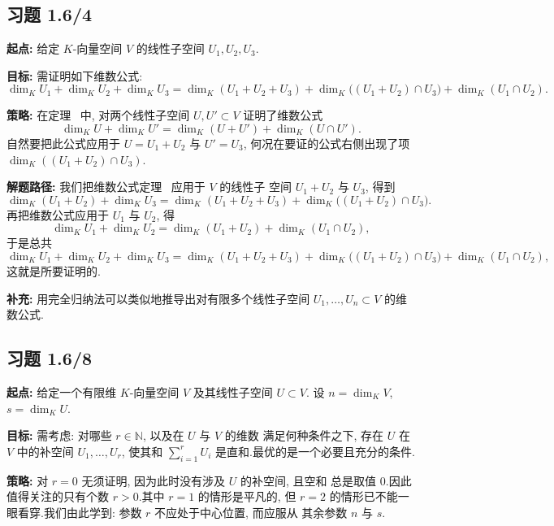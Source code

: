 \subsection*{习题 1.6/4}

\noindent\textbf{起点:} 给定 $K$-向量空间 $V$ 的线性子空间 $U_1, U_2, U_3$.

\noindent\textbf{目标:} 需证明如下维数公式:
\[
\dim_K U_1 + \dim_K U_2 + \dim_K U_3 = \dim_K (U_1 + U_2 + U_3) + \dim_K \bigl( (U_1 + U_2) \cap U_3 \bigr) + \dim_K (U_1 \cap U_2)\text{.}
\]

\noindent\textbf{策略:} 在定理~ 中, 对两个线性子空间 $U, U' \subset V$
证明了维数公式
\[
\dim_K U + \dim_K U' = \dim_K (U + U') + \dim_K (U \cap U')\text{.}
\]
自然要把此公式应用于 $U = U_1 + U_2$ 与 $U' = U_3$, 何况在要证的公式右侧出现了项
$\dim_K ((U_1 + U_2) \cap U_3)$.

\noindent\textbf{解题路径:} 我们把维数公式定理~ 应用于 $V$ 的线性子
空间 $U_1 + U_2$ 与 $U_3$, 得到
\[
\dim_K (U_1 + U_2) + \dim_K U_3 = \dim_K (U_1 + U_2 + U_3) + \dim_K \bigl( (U_1 + U_2) \cap U_3 \bigr)\text{.}
\]
再把维数公式应用于 $U_1$ 与 $U_2$, 得
\[
\dim_K U_1 + \dim_K U_2 = \dim_K (U_1 + U_2) + \dim_K (U_1 \cap U_2),
\]
于是总共
\[
\dim_K U_1 + \dim_K U_2 + \dim_K U_3 = \dim_K (U_1 + U_2 + U_3) + \dim_K \bigl( (U_1 + U_2) \cap U_3 \bigr) + \dim_K (U_1 \cap U_2),
\]
这就是所要证明的.

\noindent\textbf{补充:} 用完全归纳法可以类似地推导出对有限多个线性子空间
$U_1, \ldots, U_n \subset V$ 的维数公式.

\subsection*{习题 1.6/8}

\noindent\textbf{起点:} 给定一个有限维 $K$-向量空间 $V$ 及其线性子空间 $U \subset V$.
设 $n = \dim_K V$, $s = \dim_K U$.

\noindent\textbf{目标:} 需考虑: 对哪些 $r \in \mathbb{N}$, 以及在 $U$ 与 $V$ 的维数
满足何种条件之下, 存在 $U$ 在 $V$ 中的补空间 $U_1, \ldots, U_r$, 使其和
$\sum_{i=1}^{r} U_i$ 是直和.最优的是一个必要且充分的条件.

\noindent\textbf{策略:} 对 $r = 0$ 无须证明, 因为此时没有涉及 $U$ 的补空间, 且空和
总是取值 $0$.因此值得关注的只有个数 $r > 0$.其中 $r = 1$ 的情形是平凡的, 但
$r = 2$ 的情形已不能一眼看穿.我们由此学到: 参数 $r$ 不应处于中心位置, 而应服从
其余参数 $n$ 与 $s$.

